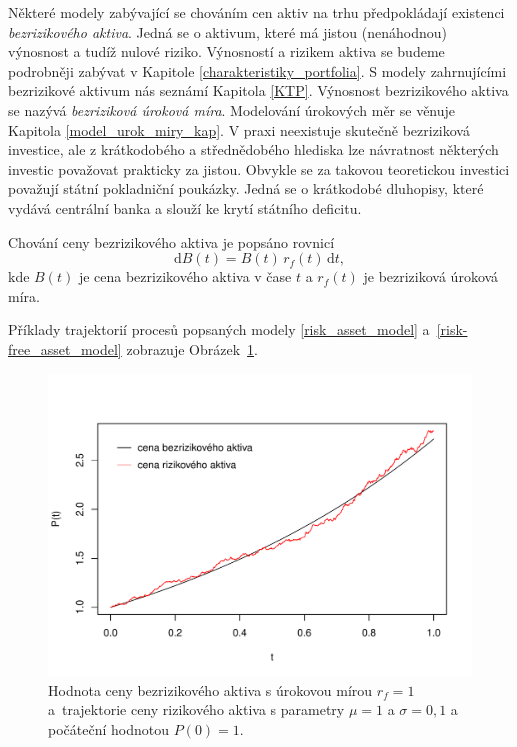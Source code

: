 \documentclass[a4paper,12pt]{report}
\theoremstyle{definition} \newtheorem{definice}[veta]{Definice}
\theoremstyle{remark}
\begin{document}
Některé modely zabývající se chováním cen aktiv na trhu předpokládají existenci \textit{bezrizikového aktiva}.
Jedná se o aktivum, které má jistou (nenáhodnou) výnosnost a tudíž nulové riziko.
Výnosností a rizikem aktiva se budeme podrobněji zabývat v Kapitole \ref{charakteristiky_portfolia}. 
S modely zahrnujícími bezrizikové aktivum nás seznámí Kapitola \ref{KTP}.
Výnosnost bezrizikového aktiva se nazývá \textit{bezriziková úroková míra}.
Modelování úrokových měr se věnuje Kapitola \ref{model_urok_miry_kap}.
V praxi neexistuje skutečně bezriziková investice, ale z krátkodobého a střednědobého hlediska lze návratnost některých investic považovat prakticky za jistou.
Obvykle se za takovou teoretickou investici považují státní pokladniční poukázky.
Jedná se o krátkodobé dluhopisy, které vydává centrální banka a slouží ke krytí státního deficitu.

Chování ceny bezrizikového aktiva je popsáno rovnicí
\begin{equation}\label{risk-free_asset_model}
\mathrm{d}B(t)=B(t)\,r_f(t)\,\mathrm{d}t,
\end{equation}
kde $B(t)$ je cena bezrizikového aktiva v čase $t$ a $r_f(t)$ je bezriziková úroková míra.

Příklady trajektorií procesů popsaných modely \eqref{risk_asset_model} a~\eqref{risk-free_asset_model} zobrazuje Obrázek~\ref{asset_model_graf}.

\begin{figure}[!htbp]
  \centering 
	\includegraphics[width=13.5cm, clip, trim= 0 15 25 50]{IMG/GWP_RFA_v5.pdf}
  \caption{Hodnota ceny bezrizikového aktiva s úrokovou mírou $r_f=1$ a~trajektorie ceny rizikového aktiva s parametry $\mu=1$ a  $\sigma=0,1$ a počáteční hodnotou $P(0)=1$.}  \label{asset_model_graf}
\end{figure}
\end{document}
